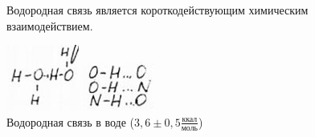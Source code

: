 \begin{lecture}[Седьмая]
	\begin{lecSection}
	\begin{figure}[H]
	Водородная связь является короткодействующим химическим взаимодействием.
	\begin{minipage}[h]{0.2\linewidth}
		\centering\includegraphics[width=\linewidth]{lecture_07/pic2}
		\caption{Водородная связь в воде ($3,6 \pm 0,5 \frac{\text{ккал}}{\textbf{моль}}$)}
	\end{minipage}
	\hfill
	\begin{minipage}[h]{0.2\linewidth}
		\centering\includegraphics[width=\linewidth]{lecture_07/pic3}

\end{minipage}
\end{figure}
\end{lecSection}
\end{lecture}
